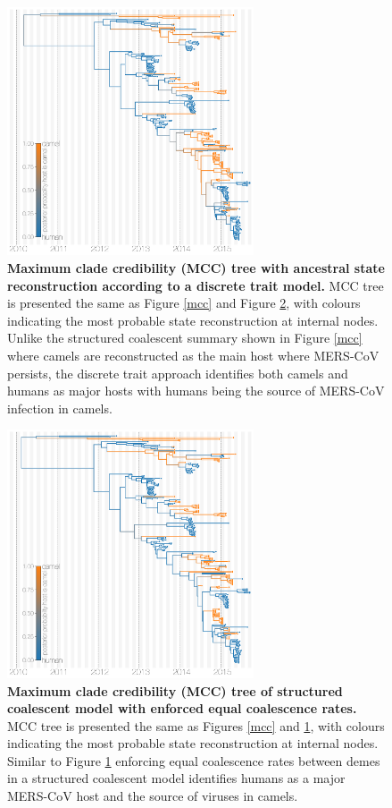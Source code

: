 \documentclass[9pt,lineno]{elife}
\begin{document}
\begin{figure}[h]
\centering
	\includegraphics[width=0.65\textwidth]{figures/mers_dta_mcc.png}
	\caption{\textbf{Maximum clade credibility (MCC) tree with ancestral state reconstruction according to a discrete trait model.}
MCC tree is presented the same as Figure \ref{mcc} and Figure \ref{equal_sizes}, with colours indicating the most probable state reconstruction at internal nodes.
Unlike the structured coalescent summary shown in Figure \ref{mcc} where camels are reconstructed as the main host where MERS-CoV persists, the discrete trait approach identifies both camels and humans as major hosts with humans being the source of MERS-CoV infection in camels.
	}
	\label{dta}
\end{figure}

\begin{figure}[h]
\centering
	\includegraphics[width=0.65\textwidth]{figures/mers_es_mcc.png}
	\caption{\textbf{Maximum clade credibility (MCC) tree of structured coalescent model with enforced equal coalescence rates.}
MCC tree is presented the same as Figures \ref{mcc} and \ref{dta}, with colours indicating the most probable state reconstruction at internal nodes.
Similar to Figure \ref{dta} enforcing equal coalescence rates between demes in a structured coalescent model identifies humans as a major MERS-CoV host and the source of viruses in camels.
	}
	\label{equal_sizes}
\end{figure}
\end{document}
